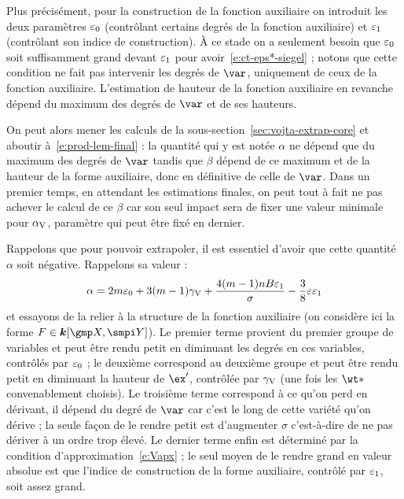 Plus précisément, pour la construction de la fonction auxiliaire on introduit
les deux paramètres \( \varepsilon\sb0 \) (contrôlant certains degrés de la fonction
auxiliaire) et \( \varepsilon\sb1 \) (contrôlant son indice de construction). À ce
stade on a seulement besoin que \( \varepsilon\sb0 \) soit suffisamment grand devant \(
  \varepsilon\sb1 \) pour avoir~\eqref{e:ct-eps*-siegel} ; notons que cette condition ne
fait pas intervenir les degrés de \( \var \), uniquement de ceux de la
fonction auxiliaire. L'estimation de hauteur de la fonction auxiliaire en
revanche dépend du maximum des degrés de \( \var \) et de ses hauteurs.

On peut alors mener les calculs de la sous-section~\ref{sec:vojta-extrap-core}
et aboutir à~\eqref{e:prod-lem-final} : la quantité qui y est notée \(
  \alpha \) ne dépend que du maximum des degrés de \( \var \) tandis que \(
  \beta \) dépend de ce maximum et de la hauteur de la forme auxiliaire, donc
en définitive de celle de \( \var \). Dans un premier temps, en attendant les
estimations finales, on peut tout à fait ne pas achever le calcul de ce \(
  \beta \) car son seul impact sera de fixer une valeur minimale pour \( \alpha \sb{\mathrm{V}}
\), paramètre qui peut être fixé en dernier.

Rappelons que pour pouvoir extrapoler, il est essentiel d'avoir que cette
quantité \( \alpha \) soit négative. Rappelons sa valeur :
\begin{equation}
  \alpha
  =
  2 m \varepsilon\sb0
  + 3 (m - 1) \gamma \sb{\mathrm{V}}
  + \frac{4 (m - 1) n B \varepsilon\sb1}{\sigma}
  - \frac38 \varepsilon \varepsilon\sb1
\end{equation}
et essayons de la relier à la structure de la fonction auxiliaire (on
considère ici la forme \( F \in \cdn[\vmp, \vmpi] \)). Le premier terme
provient du premier groupe de variables et peut être rendu petit en
diminuant les degrés en ces variables, contrôlés par \( \varepsilon\sb0 \) ; le deuxième
correspond au deuxième groupe et peut être rendu petit en diminuant la hauteur
de \( \ex' \), contrôlée par \( \gamma \sb{\mathrm{V}} \) (une fois les \( \wt* \)
convenablement choisis). Le troisième terme correspond à ce qu'on perd en
dérivant, il dépend du degré de \( \var \) car c'est le long de cette variété
qu'on dérive ; la seule façon de le rendre petit est d'augmenter \( \sigma \)
c'est-à-dire de ne pas dériver à un ordre trop élevé. Le dernier terme enfin
est déterminé par la condition d'approximation~\eqref{e:Vapx} ; le seul moyen
de le rendre grand en valeur absolue est que l'indice de construction de la
forme auxiliaire, contrôlé par \( \varepsilon\sb1 \), soit assez grand.

